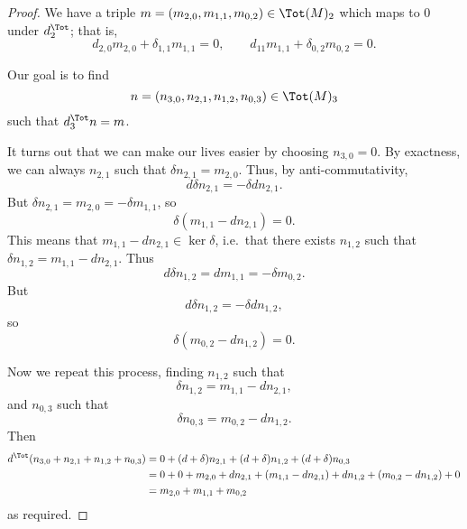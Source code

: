 \documentclass[main.tex]{subfiles}
\begin{document}
\begin{proof}
  We have a triple $m = (m_{2,0}, m_{1,1}, m_{0,2}) \in \Tot(M)_{2}$ which maps to 0 under $d^{\Tot}_{2}$; that is,
  \begin{equation*}
    d_{2,0}m_{2,0} + \delta_{1,1}m_{1,1} = 0,\qquad d_{11} m_{1,1} + \delta_{0,2} m_{0,2} = 0.
  \end{equation*}

  Our goal is to find
  \begin{equation*}
    n = (n_{3,0}, n_{2,1}, n_{1,2}, n_{0,3}) \in \Tot(M)_{3}
  \end{equation*}
  such that $d^{\Tot}_{3}n = m$.

  It turns out that we can make our lives easier by choosing $n_{3,0} = 0$. By exactness, we can always $n_{2,1}$ such that $\delta n_{2,1} = m_{2,0}$. Thus, by anti-commutativity,
  \begin{equation*}
    d \delta n_{2,1} = -\delta d n_{2,1}.
  \end{equation*}
  But $\delta n_{2,1} = m_{2,0} = -\delta m_{1,1}$, so
  \begin{equation*}
    \delta(m_{1,1} - d n_{2,1}) = 0.
  \end{equation*}
  This means that $m_{1,1} - dn_{2,1} \in \ker \delta$, i.e.\ that there exists $n_{1,2}$ such that $\delta n_{1,2} = m_{1,1} - dn_{2,1}$. Thus
  \begin{equation*}
    d \delta n_{1,2} = d m_{1,1} = -\delta m_{0,2}.
  \end{equation*}
  But
  \begin{equation*}
    d \delta n_{1,2} = -\delta d n_{1,2},
  \end{equation*}
  so
  \begin{equation*}
    \delta(m_{0,2} - d n_{1,2}) = 0.
  \end{equation*}

  Now we repeat this process, finding $n_{1,2}$ such that
  \begin{equation*}
    \delta n_{1,2} = m_{1,1} - d n_{2,1},
  \end{equation*}
  and $n_{0,3}$ such that
  \begin{equation*}
    \delta n_{0,3} = m_{0,2} - d n_{1,2}.
  \end{equation*}
  Then
  \begin{align*}
    d^{\Tot}(n_{3,0} + n_{2,1} + n_{1,2} + n_{0,3}) &= 0 + (d + \delta) n_{2,1} + (d + \delta)n_{1,2} + (d + \delta) n_{0,3} \\
    &= 0 + 0 + m_{2,0} + d n_{2,1} + (m_{1,1} - dn_{2,1}) + d n_{1,2} + (m_{0,2} - d n_{1,2}) + 0 \\
    &= m_{2,0} + m_{1,1} + m_{0,2}
  \end{align*}
  as required.
\end{proof}
\end{document}
